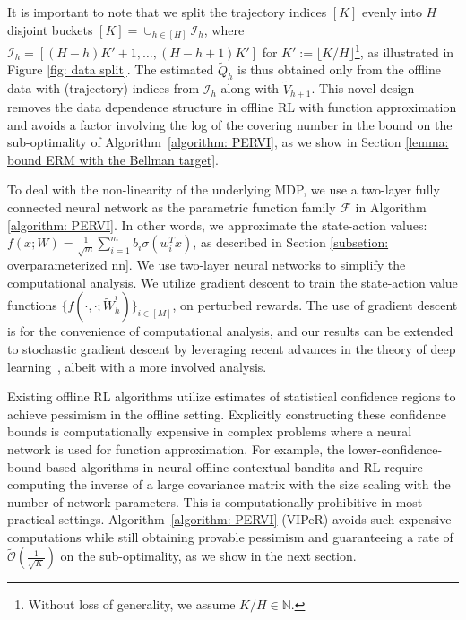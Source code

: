 \documentclass{article} \usepackage{iclr2023/iclr2023_conference,times}
\begin{document}
It is important to note that we split the trajectory indices $[K]$ evenly into $H$ disjoint buckets  $[K] = \cup_{h \in [H]} \mathcal{I}_h $, where $\mathcal{I}_h = [(H-h) K' + 1, \ldots, (H-h + 1) K']$ for $K' := \lfloor K/H \rfloor$\footnote{Without loss of generality, we assume $K / H \in \mathbb{N}$.}, as illustrated in Figure \ref{fig: data split}. The estimated $\tilde{Q}_h$ is thus obtained only from the offline data with (trajectory) indices from $\mathcal{I}_h$ along with $\tilde{V}_{h+1}$. This novel design removes the data dependence structure in offline RL with function approximation \citep{nguyentang2021sample} and avoids a factor involving the log of the covering number in the bound on the sub-optimality of Algorithm~\ref{algorithm: PERVI}, as we show in Section \ref{lemma: bound ERM with the Bellman target}. 























To deal with the non-linearity of the underlying MDP, we use a two-layer fully connected neural network as the parametric function family $\mathcal{F}$ in Algorithm \ref{algorithm: PERVI}. In other words, we approximate the state-action values: $f(x; W) = \frac{1}{\sqrt{m}}\sum_{i=1}^{m} b_i \sigma(w_i^T x)$, as described in Section \ref{subsetion: overparameterized nn}. We use two-layer neural networks to simplify the computational analysis. We utilize gradient descent to train the state-action value functions $\{f(\cdot, \cdot; \tilde{W}^i_h)\}_{i \in [M]}$, on perturbed rewards. The use of gradient descent is for the convenience of computational analysis, and our results can be extended to stochastic gradient descent by leveraging recent advances in the theory of deep learning~\citep{allen2019convergence,cao2019generalization}, albeit with a more involved analysis. 



Existing offline RL algorithms utilize estimates of statistical confidence regions to achieve pessimism in the offline setting. Explicitly constructing these confidence bounds is computationally expensive in complex problems where a neural network is used for function approximation. For example, the lower-confidence-bound-based algorithms in neural offline contextual bandits \citep{nguyen2021offline} and RL \citep{xu2022provably} require computing the inverse of a large covariance matrix with the size scaling with the number of network parameters. This is computationally prohibitive in most practical settings. Algorithm~\ref{algorithm: PERVI} (VIPeR) avoids such expensive computations while still obtaining provable pessimism and guaranteeing a  rate of $\tilde{\mathcal{O}}(\frac{1}{\sqrt{K}})$ on the sub-optimality, as we show in the next section. 
\end{document}
